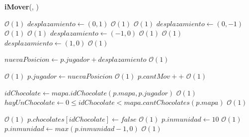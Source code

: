 \documentclass[10pt, a4paper]{article}
\newcommand{\bigO}{\mathcal{O}}
\begin{document}
\begin{Algoritmos}
        \newpage

        \begin{algorithm}[H]{\textbf{iMover}(, )}
            \begin{algorithmic}[1]
                                                                               \Comment $\bigO(1)$
                        \State $desplazamiento \gets (0,1)$                                     \Comment $\bigO(1)$
                    \EndIf
                                                                                \Comment $\bigO(1)$
                        \State $desplazamiento \gets (0,-1)$                                    \Comment $\bigO(1)$
                    \EndIf
                                                                            \Comment $\bigO(1)$
                        \State $desplazamiento \gets (-1,0)$                                    \Comment $\bigO(1)$
                    \EndIf
                                                                              \Comment $\bigO(1)$
                        \State $desplazamiento \gets (1,0)$                                     \Comment $\bigO(1)$
                    \EndIf

                    \State $nuevaPosicion \gets p.jugador + desplazamiento$                     \Comment $\bigO(1)$

                      \Comment $\bigO(1)$
                        \State $p.jugador \gets nuevaPosicion$                                                     \Comment $\bigO(1)$
                        \State $p.cantMov++$                                                                    \Comment $\bigO(1)$

                        \State $idChocolate \gets mapa.idChocolate(p.mapa, p.jugador)$                          \Comment $\bigO(1)$
                        \State $hayUnChocolate \gets 0 \leq idChocolate < mapa.cantChocolates(p.mapa)$          \Comment $\bigO(1)$

                                                        \Comment $\bigO(1)$
                            \State $p.chocolates[idChocolate] \gets false$                                      \Comment $\bigO(1)$
                            \State $p.inmunidad \gets 10$                                                       \Comment $\bigO(1)$
                        \Else
                            \State $p.inmunidad \gets max(p.inmunidad - 1, 0)$                                  \Comment $\bigO(1)$
                        \EndIf


\end{algorithmic}
\end{algorithm}
\end{Algoritmos}
\end{document}
